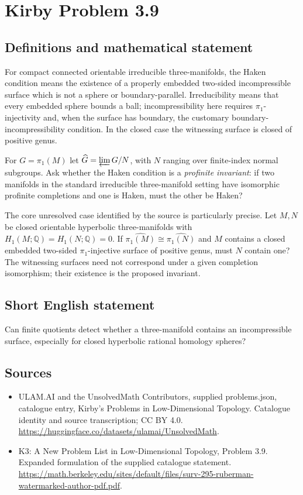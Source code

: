 \documentclass[11pt,a4paper]{article}
\begin{document}
\section*{Kirby Problem 3.9}\label{statement}

\subsection{Definitions and mathematical statement}
For compact connected orientable irreducible three-manifolds, the Haken
condition means the existence of a properly embedded two-sided incompressible
surface which is not a sphere or boundary-parallel. Irreducibility means that
every embedded sphere bounds a ball; incompressibility here requires
$\pi_1$-injectivity and, when the surface has boundary, the customary
boundary-incompressibility condition. In the closed case the witnessing
surface is closed of positive genus.

For $G=\pi_1(M)$ let $\widehat G=\varprojlim G/N$, with $N$ ranging over
finite-index normal subgroups. Ask whether the Haken condition is a
\emph{profinite invariant}: if two manifolds in the standard irreducible
three-manifold setting have isomorphic profinite completions and one is
Haken, must the other be Haken?

The core unresolved case identified by the source is particularly precise.
Let $M,N$ be closed orientable hyperbolic three-manifolds with
$H_1(M;\mathbb Q)=H_1(N;\mathbb Q)=0$. If
$\widehat{\pi_1(M)}\cong\widehat{\pi_1(N)}$ and $M$ contains a closed
embedded two-sided $\pi_1$-injective surface of positive genus, must $N$
contain one? The witnessing surfaces need not correspond under a given
completion isomorphism; their existence is the proposed invariant.
\subsection{Short English statement}
Can finite quotients detect whether a three-manifold contains an incompressible surface, especially for closed hyperbolic rational homology spheres?
\subsection{Sources}
\begin{itemize}
\item[S1] ULAM.AI and the UnsolvedMath Contributors, supplied problems.json, catalogue entry, Kirby's Problems in Low-Dimensional Topology. Catalogue identity and source transcription; CC BY 4.0.
\url{https://huggingface.co/datasets/ulamai/UnsolvedMath}.
\item[S2] K3: A New Problem List in Low-Dimensional Topology, Problem 3.9. Expanded formulation of the supplied catalogue statement.
\url{https://math.berkeley.edu/sites/default/files/surv-295-ruberman-watermarked-author-pdf.pdf}.
\end{itemize}
\end{document}
